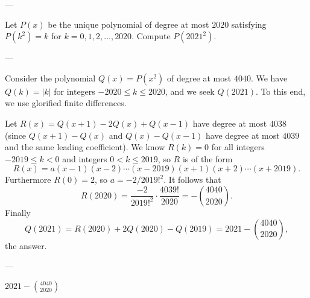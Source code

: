 
---

Let $P(x)$ be the unique polynomial of degree at most $2020$ satisfying $P(k^2)=k$ for $k=0,1,2,\ldots,2020$. Compute $P(2021^2)$.

---

Consider the polynomial $Q(x)=P(x^2)$ of degree at most $4040$. We have $Q(k)=|k|$ for integers $-2020\le k\le2020$, and we seek $Q(2021)$. To this end, we use glorified finite differences.

Let $R(x)=Q(x+1)-2Q(x)+Q(x-1)$ have degree at most $4038$ (since $Q(x+1)-Q(x)$ and $Q(x)-Q(x-1)$ have degree at most $4039$ and the same leading coefficient). We know $R(k)=0$ for all integers $-2019\le k<0$ and integers $0<k\le2019$, so $R$ is of the form \[R(x)=a(x-1)(x-2)\cdots(x-2019)(x+1)(x+2)\cdots(x+2019).\]
Furthermore $R(0)=2$, so $a=-2/2019!^2$. It follows that \[R(2020)=\frac{-2}{2019!^2}\cdot\frac{4039!}{2020}=-\binom{4040}{2020}.\]
Finally \[Q(2021)=R(2020)+2Q(2020)-Q(2019)=2021-\binom{4040}{2020},\]
the answer.

---

$2021-\binom{4040}{2020}$

